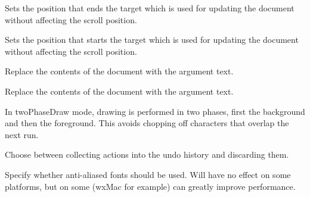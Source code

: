
Sets the position that ends the target which is used for updating the
document without affecting the scroll position.


\label{wxstyledtextctrlsettargetstart}


Sets the position that starts the target which is used for updating the
document without affecting the scroll position.


\label{wxstyledtextctrlsettext}


Replace the contents of the document with the argument text.


\label{wxstyledtextctrlsettextraw}


Replace the contents of the document with the argument text.


\label{wxstyledtextctrlsettwophasedraw}


In twoPhaseDraw mode, drawing is performed in two phases, first the background
and then the foreground. This avoids chopping off characters that overlap the next run.


\label{wxstyledtextctrlsetundocollection}


Choose between collecting actions into the undo
history and discarding them.


\label{wxstyledtextctrlsetuseantialiasing}


Specify whether anti-aliased fonts should be used.  Will have no effect
on some platforms, but on some (wxMac for example) can greatly improve
performance.


\label{wxstyledtextctrlsetusehorizontalscrollbar}

